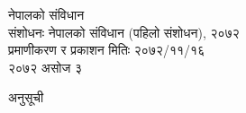 \documentclass[12pt, a4paper]{article}
\begin{document}
\begin{titlepage}
    \begin{center}
    \LARGE{नेपालको संविधान} \\
    \vfill
    \small{संशोधनः नेपालको संविधान (पहिलो संशोधन), २०७२} \\
    \small{प्रमाणीकरण र प्रकाशन मितिः २०७२/११/१६} \\
    \vfill
    \Large{२०७२ असोज ३}
    \end{center}
\end{titlepage}

{\Large{अनुसूची}}
\def\contentsname{\empty}
\tableofcontents
\pagebreak
\end{document}
